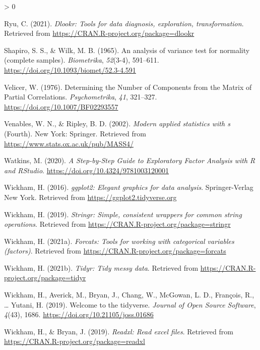 \documentclass[
  english,
  man]{apa6}
\newlength{\cslhangindent}
\newenvironment{CSLReferences}[2] %
 {%
  \setlength{\parindent}{0pt}
  \ifodd #1 \everypar{\setlength{\hangindent}{\cslhangindent}}\ignorespaces\fi
  \ifnum #2 > 0
  \setlength{\parskip}{#2\baselineskip}
  \fi
 }%
 {}
\begin{document}
\begin{CSLReferences}{1}{0}
\leavevmode\hypertarget{ref-R-dlookr}{}%
Ryu, C. (2021). \emph{Dlookr: Tools for data diagnosis, exploration, transformation}. Retrieved from \url{https://CRAN.R-project.org/package=dlookr}

\leavevmode\hypertarget{ref-shapiroAnalysisVarianceTest1965}{}%
Shapiro, S. S., \& Wilk, M. B. (1965). An analysis of variance test for normality (complete samples). \emph{Biometrika}, \emph{52}(3-4), 591--611. \url{https://doi.org/10.1093/biomet/52.3-4.591}

\leavevmode\hypertarget{ref-velicerDeterminingNumberComponents1976}{}%
Velicer, W. (1976). Determining the {Number} of {Components} from the {Matrix} of {Partial Correlations}. \emph{Psychometrika}, \emph{41}, 321--327. \url{https://doi.org/10.1007/BF02293557}

\leavevmode\hypertarget{ref-R-MASS}{}%
Venables, W. N., \& Ripley, B. D. (2002). \emph{Modern applied statistics with s} (Fourth). New York: Springer. Retrieved from \url{https://www.stats.ox.ac.uk/pub/MASS4/}

\leavevmode\hypertarget{ref-watkinsStepbyStepGuideExploratory2020}{}%
Watkins, M. (2020). \emph{A {Step}-by-{Step Guide} to {Exploratory Factor Analysis} with {R} and {RStudio}}. \url{https://doi.org/10.4324/9781003120001}

\leavevmode\hypertarget{ref-R-ggplot2}{}%
Wickham, H. (2016). \emph{ggplot2: Elegant graphics for data analysis}. Springer-Verlag New York. Retrieved from \url{https://ggplot2.tidyverse.org}

\leavevmode\hypertarget{ref-R-stringr}{}%
Wickham, H. (2019). \emph{Stringr: Simple, consistent wrappers for common string operations}. Retrieved from \url{https://CRAN.R-project.org/package=stringr}

\leavevmode\hypertarget{ref-R-forcats}{}%
Wickham, H. (2021a). \emph{Forcats: Tools for working with categorical variables (factors)}. Retrieved from \url{https://CRAN.R-project.org/package=forcats}

\leavevmode\hypertarget{ref-R-tidyr}{}%
Wickham, H. (2021b). \emph{Tidyr: Tidy messy data}. Retrieved from \url{https://CRAN.R-project.org/package=tidyr}

\leavevmode\hypertarget{ref-R-tidyverse}{}%
Wickham, H., Averick, M., Bryan, J., Chang, W., McGowan, L. D., François, R., \ldots{} Yutani, H. (2019). Welcome to the {tidyverse}. \emph{Journal of Open Source Software}, \emph{4}(43), 1686. \url{https://doi.org/10.21105/joss.01686}

\leavevmode\hypertarget{ref-R-readxl}{}%
Wickham, H., \& Bryan, J. (2019). \emph{Readxl: Read excel files}. Retrieved from \url{https://CRAN.R-project.org/package=readxl}


\end{CSLReferences}
\end{document}
